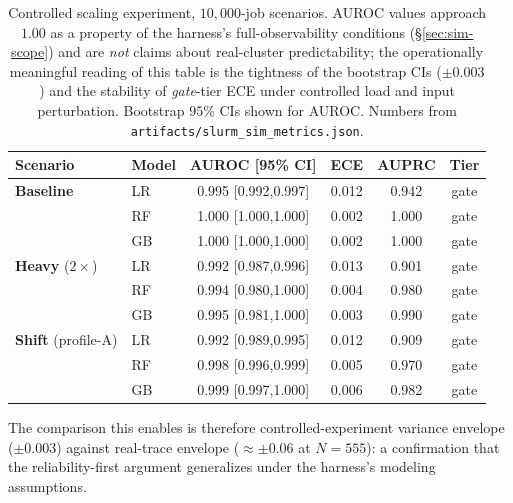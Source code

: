 \documentclass[conference]{IEEEtran}
\begin{document}
\begin{table}[!htbp]
\caption{Controlled scaling experiment, $10{,}000$-job scenarios. AUROC values approach $1.00$ as a property of the harness's full-observability conditions (\S\ref{sec:sim-scope}) and are \emph{not} claims about real-cluster predictability; the operationally meaningful reading of this table is the tightness of the bootstrap CIs ($\pm 0.003$) and the stability of \emph{gate}-tier ECE under controlled load and input perturbation. Bootstrap $95\%$ CIs shown for AUROC. Numbers from \texttt{artifacts/slurm\_sim\_metrics.json}.}
\label{tab:sim-scale}
\centering
\scriptsize
\setlength{\tabcolsep}{3pt}
\begin{tabular}{llcccc}
\toprule
Scenario & Model & AUROC [95\% CI] & ECE & AUPRC & Tier \\
\midrule
\textbf{Baseline}        & LR & 0.995 [0.992,0.997] & 0.012 & 0.942 & gate \\
                         & RF & 1.000 [1.000,1.000] & 0.002 & 1.000 & gate \\
                         & GB & 1.000 [1.000,1.000] & 0.002 & 1.000 & gate \\
\addlinespace
\textbf{Heavy} ($2\times$) & LR & 0.992 [0.987,0.996] & 0.013 & 0.901 & gate \\
                         & RF & 0.994 [0.980,1.000] & 0.004 & 0.980 & gate \\
                         & GB & 0.995 [0.981,1.000] & 0.003 & 0.990 & gate \\
\addlinespace
\textbf{Shift} (profile-A) & LR & 0.992 [0.989,0.995] & 0.012 & 0.909 & gate \\
                         & RF & 0.998 [0.996,0.999] & 0.005 & 0.970 & gate \\
                         & GB & 0.999 [0.997,1.000] & 0.006 & 0.982 & gate \\
\bottomrule
\end{tabular}
\end{table}

The comparison this enables is therefore controlled-experiment variance envelope ($\pm 0.003$) against real-trace envelope ($\approx \pm 0.06$ at $N{=}555$): a confirmation that the reliability-first argument generalizes under the harness's modeling assumptions.
\end{document}
